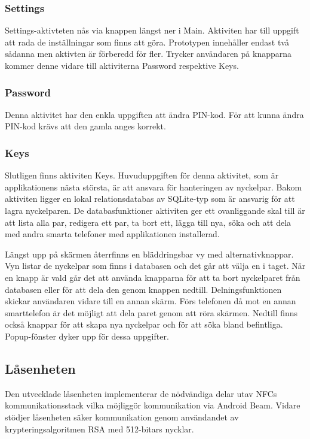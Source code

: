 \documentclass[11pt]{article}
\begin{document}
\subsubsection{Settings}
Settings-aktivteten nås via knappen längst ner i Main. Aktiviten har till uppgift att rada de inställningar som finns att göra. Prototypen innehåller endast två sådanna men aktivten är förberedd för fler. Trycker användaren på knapparna kommer denne vidare till aktiviterna Password respektive Keys.

\subsubsection{Password}
Denna aktivitet har den enkla uppgiften att ändra PIN-kod. För att kunna ändra PIN-kod krävs att den gamla anges korrekt.

\subsubsection{Keys}
Slutligen finns aktiviten Keys. Huvuduppgiften för denna aktivitet, som är applikationens nästa största, är att ansvara för hanteringen av nyckelpar. Bakom aktiviten ligger en lokal relationsdatabas av SQLite-typ som är ansvarig för att lagra nyckelparen. De databasfunktioner aktiviten ger ett ovanliggande skal till är att lista alla par, redigera ett par, ta bort ett, lägga till nya, söka och att dela med andra smarta telefoner med applikationen installerad.

Längst upp på skärmen återrfinns en bläddringsbar vy med alternativknappar. Vyn listar de nyckelpar som finns i databasen och det går att välja en i taget. När en knapp är vald går det att använda knapparna för att ta bort nyckelparet från databasen eller för att dela den genom knappen nedtill. Delningsfunktionen skickar användaren vidare till en annan skärm. Förs telefonen då mot en annan smarttelefon är det möjligt att dela paret genom att röra skärmen. Nedtill finns också knappar för att skapa nya nyckelpar och för att söka bland befintliga. Popup-fönster dyker upp för dessa uppgifter.

\subsection{Låsenheten}
Den utvecklade låsenheten implementerar de nödvändiga delar utav NFCs kommunikationsstack vilka möjliggör  kommunikation via Android Beam. Vidare stödjer låsenheten säker kommunikation genom användandet av krypteringsalgoritmen RSA med 512-bitars nycklar. 
\end{document}
